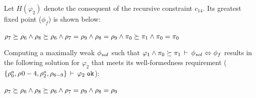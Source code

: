 Let $H(\varphi_2)$ denote the consequent of the recursive constraint
$c_{14}$. Its greatest fixed point ($\phi_f$) is shown below:
\begin{center}
\(
  \rho_7 \succeq \rho_6 \wedge \rho_8 \succeq \rho_6 \wedge \rho_7 =
  \rho_9 \wedge \rho_8 = \rho_9 \wedge \pi_0 \succeq \pi_1 \wedge
  \pi_0 = \pi_0
\)
\end{center}
Computing a maximally weak $\phi_{sol}$ such that $\varphi_1
\wedge \pi_0 \succeq \pi_1\,\vdash\,\phi_{sol} \Leftrightarrow \phi_f$
results in the following solution for $\varphi_2$ that meets its
well-formedness requirement ($\{\rho^a_0,\rho_{}0-4,
\rho^a_2, \rho_{6-9}\}\,\vdash\,\varphi_2 \; \texttt{ok} $):
\begin{center}
\(
  \rho_7 \succeq \rho_6 \wedge \rho_8 \succeq \rho_6 \wedge \rho_7 =
  \rho_9 \wedge \rho_8 = \rho_9
\)
\end{center}






